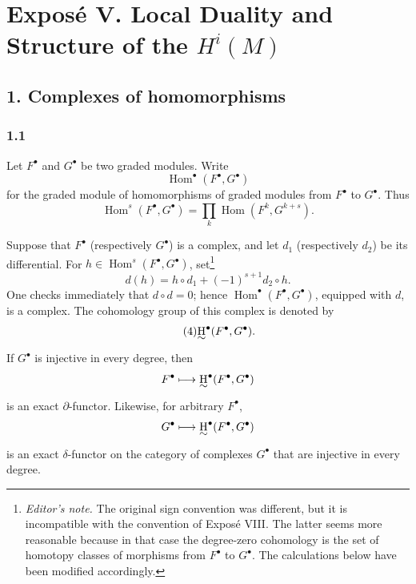 \documentclass[11pt,a4paper]{article}
\newcommand{\Homop}{\operatorname{Hom}}
\newcommand{\UH}{\underset{\raisebox{1pt}{$\sim$}}{\mathrm{H}}}
\newcommand{\srcpage}[1]{\marginpar{\raggedright\scriptsize\color{rulegray}French printed p.~#1}}
\theoremstyle{sgaprop}
\theoremstyle{sgacor}
\begin{document}
\clearpage

\section*{Expos\'e V. Local Duality and Structure of the $H^i(M)$}

\subsection*{1. Complexes of homomorphisms}

\subsubsection*{1.1}

Let $F^{\bullet}$ and $G^{\bullet}$ be two graded modules. Write\srcpage{61}
\begin{equation}\tag{1}\label{V.1}
  \Homop^{\bullet}(F^{\bullet},G^{\bullet})
\end{equation}
for the graded module of homomorphisms of graded modules from $F^{\bullet}$
to $G^{\bullet}$. Thus
\begin{equation}\tag{2}\label{V.2}
  \Homop^{s}(F^{\bullet},G^{\bullet})
    =\prod_k \Homop(F^k,G^{k+s}).
\end{equation}

Suppose that $F^{\bullet}$ (respectively $G^{\bullet}$) is a complex, and let
$d_1$ (respectively $d_2$) be its differential. For
$h\in\Homop^s(F^{\bullet},G^{\bullet})$, set\footnote{\textit{Editor's note.}
The original sign convention was different, but it is incompatible with the
convention of Expos\'e VIII. The latter seems more reasonable because in that
case the degree-zero cohomology is the set of homotopy classes of morphisms
from $F^{\bullet}$ to $G^{\bullet}$. The calculations below have been modified
accordingly.}
\begin{equation}\tag{3}\label{V.3}
  d(h)=h\circ d_1+(-1)^{s+1}d_2\circ h.
\end{equation}
One checks immediately that $d\circ d=0$; hence
$\Homop^{\bullet}(F^{\bullet},G^{\bullet})$, equipped with $d$, is a complex.
The cohomology group of this complex is denoted by
\begin{equation}\tag{4}\label{V.4}
  \UH^{\bullet}(F^{\bullet},G^{\bullet}).
\end{equation}
If $G^{\bullet}$ is injective in every degree, then
\[
  F^{\bullet}\longmapsto
  \UH^{\bullet}(F^{\bullet},G^{\bullet})
\]
is an exact $\partial$-functor. Likewise, for arbitrary $F^{\bullet}$,
\[
  G^{\bullet}\longmapsto
  \UH^{\bullet}(F^{\bullet},G^{\bullet})
\]
is an exact $\delta$-functor on the category of complexes $G^{\bullet}$ that
are injective in every degree.
\end{document}
